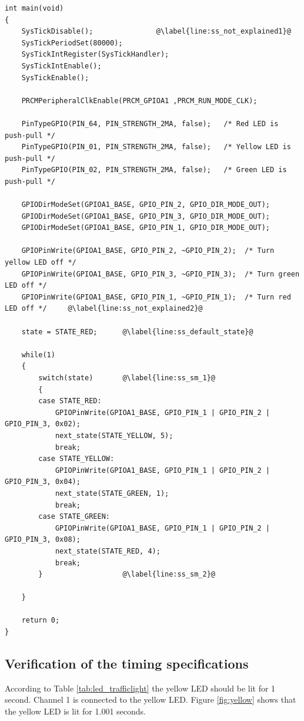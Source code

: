 \begin{lstlisting}[style=CStyle, caption={Second part of the static scheduler}, captionpos=b, label={lst:static_scheduler_2}, escapechar=@]
int main(void)
{
    SysTickDisable();               @\label{line:ss_not_explained1}@
    SysTickPeriodSet(80000);
    SysTickIntRegister(SysTickHandler);
    SysTickIntEnable();
    SysTickEnable();

    PRCMPeripheralClkEnable(PRCM_GPIOA1 ,PRCM_RUN_MODE_CLK);

    PinTypeGPIO(PIN_64, PIN_STRENGTH_2MA, false);   /* Red LED is push-pull */
    PinTypeGPIO(PIN_01, PIN_STRENGTH_2MA, false);   /* Yellow LED is push-pull */
    PinTypeGPIO(PIN_02, PIN_STRENGTH_2MA, false);   /* Green LED is push-pull */

    GPIODirModeSet(GPIOA1_BASE, GPIO_PIN_2, GPIO_DIR_MODE_OUT);
    GPIODirModeSet(GPIOA1_BASE, GPIO_PIN_3, GPIO_DIR_MODE_OUT);
    GPIODirModeSet(GPIOA1_BASE, GPIO_PIN_1, GPIO_DIR_MODE_OUT);

    GPIOPinWrite(GPIOA1_BASE, GPIO_PIN_2, ~GPIO_PIN_2);  /* Turn yellow LED off */
    GPIOPinWrite(GPIOA1_BASE, GPIO_PIN_3, ~GPIO_PIN_3);  /* Turn green LED off */
    GPIOPinWrite(GPIOA1_BASE, GPIO_PIN_1, ~GPIO_PIN_1);  /* Turn red LED off */     @\label{line:ss_not_explained2}@

    state = STATE_RED;      @\label{line:ss_default_state}@

    while(1)
    {
        switch(state)       @\label{line:ss_sm_1}@
        {
        case STATE_RED:
            GPIOPinWrite(GPIOA1_BASE, GPIO_PIN_1 | GPIO_PIN_2 | GPIO_PIN_3, 0x02);
            next_state(STATE_YELLOW, 5);
            break;
        case STATE_YELLOW:
            GPIOPinWrite(GPIOA1_BASE, GPIO_PIN_1 | GPIO_PIN_2 | GPIO_PIN_3, 0x04);
            next_state(STATE_GREEN, 1);
            break;
        case STATE_GREEN:
            GPIOPinWrite(GPIOA1_BASE, GPIO_PIN_1 | GPIO_PIN_2 | GPIO_PIN_3, 0x08);
            next_state(STATE_RED, 4);
            break;
        }                   @\label{line:ss_sm_2}@

    }

    return 0;
}
\end{lstlisting}

\newpage
\subsection{Verification of the timing specifications}

According to Table \ref{tab:led_trafficlight} the yellow LED should be lit for 1 second.
Channel 1 is connected to the yellow LED. Figure \ref{fig:yellow} shows that the yellow LED is lit for 1.001 seconds.

